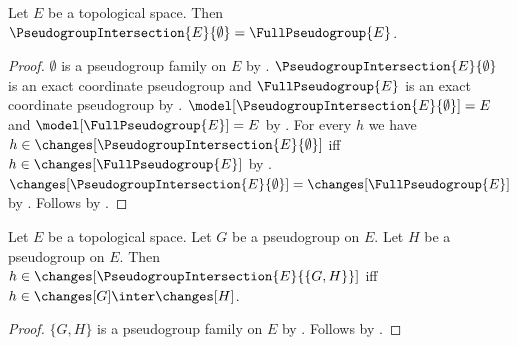 \begin{theorem}\label{empty_pseudogroup_intersection}
    Let $E$ be a topological space.
    Then $\PseudogroupIntersection{E}{\emptyset}=\FullPseudogroup{E}$.
\end{theorem}
\begin{proof}
    $\emptyset$ is a pseudogroup family on $E$ by .
    $\PseudogroupIntersection{E}{\emptyset}$ is an exact coordinate pseudogroup and
        $\FullPseudogroup{E}$ is an exact coordinate pseudogroup by
        .
    $\model[\PseudogroupIntersection{E}{\emptyset}]=E$ and
        $\model[\FullPseudogroup{E}]=E$ by
        .
    For every $h$ we have $h\in\changes[\PseudogroupIntersection{E}{\emptyset}]$ iff
        $h\in\changes[\FullPseudogroup{E}]$ by
        .
    $\changes[\PseudogroupIntersection{E}{\emptyset}]=\changes[\FullPseudogroup{E}]$ by
        .
    Follows by .
\end{proof}

\begin{theorem}\label{binary_pseudogroup_intersection_changes}
    Let $E$ be a topological space.
    Let $G$ be a pseudogroup on $E$.
    Let $H$ be a pseudogroup on $E$.
    Then $h\in\changes[\PseudogroupIntersection{E}{\{G,H\}}]$ iff
        $h\in\changes[G]\inter\changes[H]$.
\end{theorem}
\begin{proof}
    $\{G,H\}$ is a pseudogroup family on $E$ by .
    Follows by .
\end{proof}
